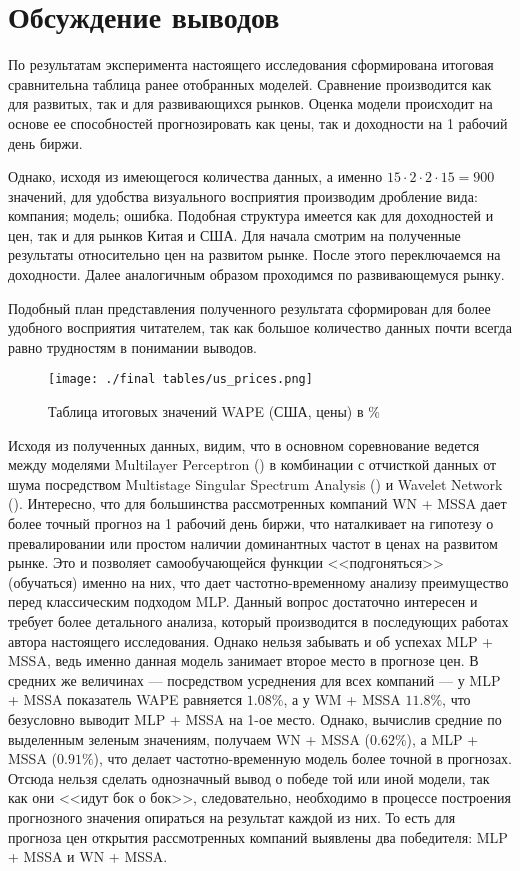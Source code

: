 \section{Обсуждение выводов}
По результатам эксперимента настоящего исследования сформирована итоговая сравнительна таблица ранее отобранных моделей. Сравнение производится как для развитых, так и для развивающихся рынков. Оценка модели происходит на основе ее способностей прогнозировать как цены, так и доходности на 1 рабочий день биржи.

Однако, исходя из имеющегося количества данных, а именно $15 \cdot 2 \cdot  2 \cdot 15 = 900$ значений, для удобства визуального восприятия производим дробление вида: компания; модель; ошибка. Подобная структура имеется как для доходностей и цен, так и для рынков Китая и США. Для начала смотрим на полученные результаты относительно цен на развитом рынке. После этого переключаемся на доходности. Далее аналогичным образом проходимся по развивающемуся рынку.

Подобный план представления полученного результата сформирован для более удобного восприятия читателем, так как большое количество данных почти всегда равно трудностям в понимании выводов.

\begin{figure}[H]
	\centering
	\texttt{[image: ./final tables/us\_prices.png]}
	\caption{Таблица итоговых значений WAPE (США, цены) в \%}
	\label{pic::final_table_us_prices}
\end{figure}

\noindent Исходя из полученных данных, видим, что в основном соревнование ведется между моделями Multilayer Perceptron () в комбинации с отчисткой данных от шума посредством Multistage Singular Spectrum Analysis () и Wavelet Network (). Интересно, что для большинства рассмотренных компаний WN + MSSA дает более точный прогноз на 1 рабочий день биржи, что наталкивает на гипотезу о превалировании или простом наличии доминантных частот в ценах на развитом рынке. Это и позволяет самообучающейся функции <<подгоняться>> (обучаться) именно на них, что дает частотно-временному анализу преимущество перед классическим подходом MLP. Данный вопрос достаточно интересен и требует более детального анализа, который производится в последующих работах автора настоящего исследования. Однако нельзя забывать и об успехах MLP + MSSA, ведь именно данная модель занимает второе место в прогнозе цен. В средних же величинах --- посредством усреднения для всех компаний --- у MLP + MSSA показатель WAPE равняется $1.08\%$, а у WM + MSSA $11.8\%$, что безусловно выводит MLP + MSSA на 1-ое место. Однако, вычислив средние по выделенным зеленым значениям, получаем WN + MSSA ($0.62\%$), а MLP + MSSA ($0.91\%$), что делает частотно-временную модель более точной в прогнозах. Отсюда нельзя сделать однозначный вывод о победе той или иной модели, так как они <<идут бок о бок>>, следовательно, необходимо в процессе построения прогнозного значения опираться на результат каждой из них. То есть для прогноза цен открытия рассмотренных компаний выявлены два победителя: MLP + MSSA и WN + MSSA.

